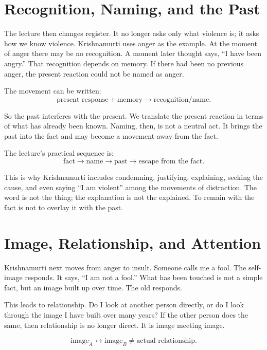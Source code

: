 \section{Recognition, Naming, and the Past}

The lecture then changes register. It no longer asks only what violence is; it asks how we know violence. Krishnamurti uses anger as the example. At the moment of anger there may be no recognition. A moment later thought says, ``I have been angry.'' That recognition depends on memory. If there had been no previous anger, the present reaction could not be named as anger.

The movement can be written:
\begin{equation}
\text{present response}+\text{memory}
\rightarrow
\text{recognition/name}.
\end{equation}

So the past interferes with the present. We translate the present reaction in terms of what has already been known. Naming, then, is not a neutral act. It brings the past into the fact and may become a movement away from the fact.

The lecture's practical sequence is:
\begin{equation}
\text{fact}
\rightarrow
\text{name}
\rightarrow
\text{past}
\rightarrow
\text{escape from the fact}.
\end{equation}

This is why Krishnamurti includes condemning, justifying, explaining, seeking the cause, and even saying ``I am violent'' among the movements of distraction. The word is not the thing; the explanation is not the explained. To remain with the fact is not to overlay it with the past.

\section{Image, Relationship, and Attention}

Krishnamurti next moves from anger to insult. Someone calls me a fool. The self-image responds. It says, ``I am not a fool.'' What has been touched is not a simple fact, but an image built up over time. The old responds.

This leads to relationship. Do I look at another person directly, or do I look through the image I have built over many years? If the other person does the same, then relationship is no longer direct. It is image meeting image.

\begin{equation}
\text{image}_A \leftrightarrow \text{image}_B
\neq
\text{actual relationship}.
\end{equation}


